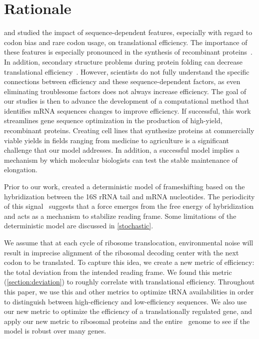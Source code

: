 \documentclass[12pt]{article}
\begin{document}
\section{Rationale}
\citet{kozak05} and \citet{kane95} studied the impact
of sequence-dependent features, especially with regard to codon bias 
and rare codon usage, on translational efficiency.  The importance of 
these features is especially pronounced in the synthesis of recombinant 
proteins~\cite{sorensen05}.  In addition, secondary structure problems 
during protein folding can decrease translational 
efficiency~\cite{kozak05}.  However, scientists do not fully
understand the specific connections between efficiency and these
sequence-dependent factors, as even eliminating troublesome factors
does not always increase efficiency. The goal of our studies is then to
advance the development of a computational method that identifies mRNA
sequences changes to improve efficiency. If
successful, this work streamlines gene sequence optimization in the
production of high-yield, recombinant proteins. Creating cell lines
that synthesize proteins at commercially viable yields in fields ranging from
medicine to agriculture is a significant challenge that our model
addresses. In addition, a successful model implies a mechanism by
which molecular biologists can test the stable maintenance of
elongation.

Prior to our work, \citet{lalit:jbsb} created a deterministic model of
frameshifting based on the hybridization between the 16S rRNA tail and
mRNA nucleotides.  The periodicity of this
signal~\cite{lalit:jbsb} suggests that a force emerges from the free
energy of hybridization and acts as a mechanism to
stabilize reading frame.  Some limitations of the deterministic 
model are discussed in \autoref{stochastic}.

We assume that at each cycle of ribosome translocation, environmental noise will result in imprecise alignment of the ribosomal decoding center with the next codon to be translated.  To capture this idea, we create a new metric of efficiency: the total 
deviation from the intended reading frame.  We found this metric
(\autoref{section:deviation}) to roughly correlate with translational
efficiency.  Throughout this paper, we use this and other metrics to
optimize tRNA availabilities in order to distinguish between
high-efficiency and low-efficiency sequences. We also use our new
metric to optimize the efficiency of a translationally regulated gene, 
and apply our new metric to ribosomal proteins and the entire \ecoli\ 
genome to see if the model is robust over many genes.
\end{document}

